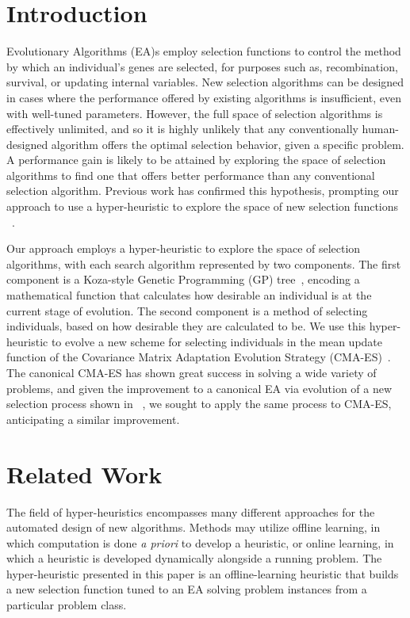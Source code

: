\documentclass[sigconf]{acmart}
\begin{document}
\section{Introduction}
\label{Introduction}
Evolutionary Algorithms (EA)s employ selection functions to control the method by which an individual's genes are selected, for purposes such as, recombination, survival, or updating internal variables. New selection algorithms can be designed in cases where the performance offered by existing algorithms is insufficient, even with well-tuned parameters. However, the full space of selection algorithms is effectively unlimited, and so it is highly unlikely that any conventionally human-designed algorithm offers the optimal selection behavior, given a specific problem. A performance gain is likely to be attained by exploring the space of selection algorithms to find one that offers better performance than any conventional selection algorithm. Previous work has confirmed this hypothesis, prompting our approach to use a hyper-heuristic to explore the space of new selection functions ~\citep{woodward2011selection}.

Our approach employs a hyper-heuristic to explore the space of selection algorithms, with each search algorithm represented by two components. The first component is a Koza-style Genetic Programming (GP) tree~\citep{koza1994genetic}, encoding a mathematical function that calculates how desirable an individual is at the current stage of evolution. The second component is a method of selecting individuals, based on how desirable they are calculated to be. We use this hyper-heuristic to evolve a new scheme for selecting individuals in the mean update function of the Covariance Matrix Adaptation Evolution Strategy (CMA-ES)~\citep{hansen1996cmaes}. The canonical CMA-ES has shown great success in solving a wide variety of problems, and given the improvement to a canonical EA via evolution of a new selection process shown in ~\citep{richter2018adpsea}, we sought to apply the same process to CMA-ES, anticipating a similar improvement.

\section{Related Work}
\label{Literature Review}
The field of hyper-heuristics encompasses many different approaches for the automated design of new algorithms. Methods may utilize offline learning, in which computation is done \textit{a priori} to develop a heuristic, or online learning, in which a heuristic is developed dynamically alongside a running problem. The hyper-heuristic presented in this paper is an offline-learning heuristic that builds a new selection function tuned to an EA solving problem instances from a particular problem class.
\end{document}
